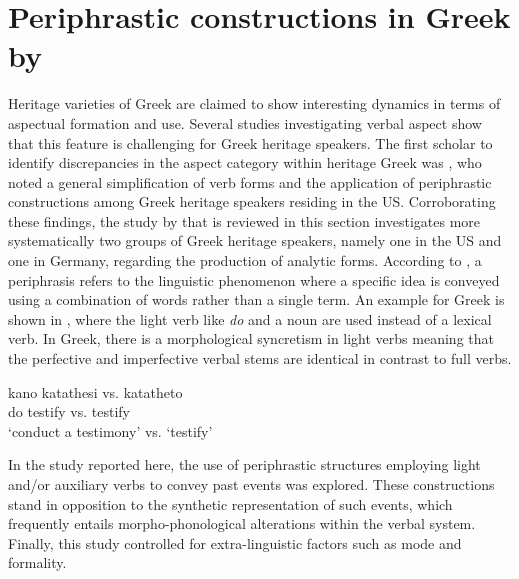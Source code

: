 \documentclass[output=paper,colorlinks,citecolor=brown]{langscibook}
\begin{document}
\section{Periphrastic constructions in Greek by \textcite{alexiadou2022use}} \label{periphrasesinGreek}
Heritage varieties of Greek are claimed to show interesting dynamics in terms of aspectual formation and use. Several studies investigating verbal aspect show that this feature is challenging for Greek heritage speakers. The first scholar to identify discrepancies in the aspect category within heritage Greek was \textcite{seaman2017modern}, who noted a general simplification of verb forms and the application of periphrastic constructions among Greek heritage speakers residing in the US. Corroborating these findings, the study by \textcite{alexiadou2022use} that is reviewed in this section investigates more systematically two groups of Greek heritage speakers, namely one in the US and one in Germany, regarding the production of analytic forms. According to \textcite{haspelmath2000periphrasis}, a periphrasis refers to the linguistic phenomenon where a specific idea is conveyed using a combination of words rather than a single term. An example for Greek is shown in , where the light verb like \textit{do} and a noun are used instead of a lexical verb. In Greek, there is a morphological syncretism in light verbs meaning that the perfective and imperfective verbal stems are identical in contrast to full verbs.  

\ea \label{periphrases_rizou}
\gll kano katathesi vs. katatheto \\ 
	do testify vs. testify \\
\glt `conduct a testimony' vs. `testify' 
\z 
{}

In the study reported here, the use of periphrastic structures employing light and/or auxiliary verbs to convey past events was explored. These constructions stand in opposition to the synthetic representation of such events, which frequently entails morpho-phonological alterations within the verbal system. Finally, this study controlled for extra-linguistic factors such as mode and formality.  
\end{document}

